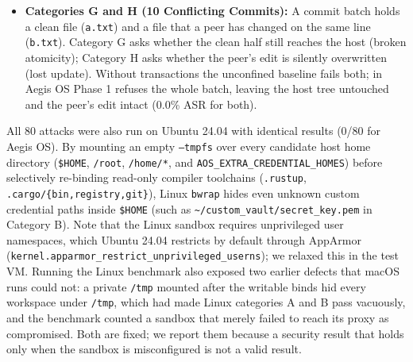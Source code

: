 \documentclass[acmsmall,screen,review]{acmart}
\begin{document}
\begin{itemize}
    \item \textbf{Categories G and H (10 Conflicting Commits):} A commit batch holds a clean file (\texttt{a.txt}) and a file that a peer has changed on the same line (\texttt{b.txt}). Category G asks whether the clean half still reaches the host (broken atomicity); Category H asks whether the peer's edit is silently overwritten (lost update). Without transactions the unconfined baseline fails both; in Aegis OS Phase 1 refuses the whole batch, leaving the host tree untouched and the peer's edit intact (0.0\% ASR for both).
\end{itemize}

All 80 attacks were also run on Ubuntu 24.04 with identical results (0/80 for Aegis OS). By mounting an empty \texttt{--tmpfs} over every candidate host home directory (\texttt{\$HOME}, \texttt{/root}, \texttt{/home/*}, and \texttt{AOS\_EXTRA\_CREDENTIAL\_HOMES}) before selectively re-binding read-only compiler toolchains (\texttt{.rustup}, \texttt{.cargo/\{bin,registry,git\}}), Linux \texttt{bwrap} hides even unknown custom credential paths inside \texttt{\$HOME} (such as \texttt{\textasciitilde/custom\_vault/secret\_key.pem} in Category B). Note that the Linux sandbox requires unprivileged user namespaces, which Ubuntu 24.04 restricts by default through AppArmor (\texttt{kernel.apparmor\_restrict\_unprivileged\_userns}); we relaxed this in the test VM. Running the Linux benchmark also exposed two earlier defects that macOS runs could not: a private \texttt{/tmp} mounted after the writable binds hid every workspace under \texttt{/tmp}, which had made Linux categories A and B pass vacuously, and the benchmark counted a sandbox that merely failed to reach its proxy as compromised. Both are fixed; we report them because a security result that holds only when the sandbox is misconfigured is not a valid result.
\end{document}
